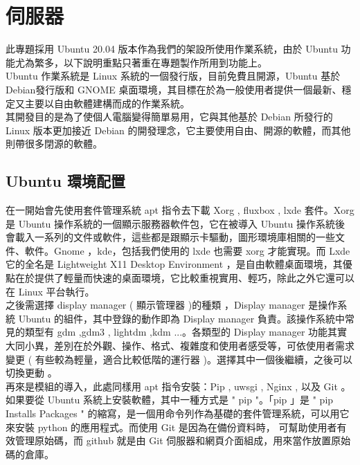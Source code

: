 \documentclass[14pt,a4paper]{report}  %
\begin{document}
\begin{enumerate}

\end{enumerate}

\newpage
\chapter{伺服器}
 此專題採用 Ubuntu 20.04 版本作為我們的架設所使用作業系統，由於 Ubuntu 功能尤為繁多，以下說明重點只著重在專題製作所用到功能上。\\
 
 Ubuntu 作業系統是 Linux 系統的一個發行版，目前免費且開源，Ubuntu 基於 Debian發行版和 GNOME 桌面環境，其目標在於為一般使用者提供一個最新、穩定又主要以自由軟體建構而成的作業系統。\\
 
 其開發目的是為了使個人電腦變得簡單易用，它與其他基於 Debian 所發行的 Linux 版本更加接近 Debian 的開發理念，它主要使用自由、開源的軟體，而其他則帶很多閉源的軟體。\\
\section{Ubuntu 環境配置}
 在一開始會先使用套件管理系統 apt 指令去下載 Xorg , fluxbox , lxde 套件。Xorg 是 Ubuntu 操作系統的一個顯示服務器軟件包，它在被導入 Ubuntu 操作系統後會載入一系列的文件或軟件，這些都是跟顯示卡驅動，圖形環境庫相關的一些文件、軟件。Gnome ，kde，包括我們使用的 lxde 也需要 xorg 才能實現。而 Lxde 它的全名是 Lightweight X11 Desktop Environment ，是自由軟體桌面環境，其優點在於提供了輕量而快速的桌面環境，它比較重視實用、輕巧，除此之外它還可以在 Linux 平台執行。\\
 
 之後需選擇 display manager ( 顯示管理器 )的種類 ，Display manager 是操作系統 Ubuntu 的組件，其中登錄的動作即為 Display manager 負責。該操作系統中常見的類型有 gdm ,gdm3 , lightdm ,kdm ...。各類型的 Display manager 功能其實大同小異，差別在於外觀、操作、格式、複雜度和使用者感受等，可依使用者需求變更 ( 有些較為輕量，適合比較低階的運行器 )。選擇其中一個後繼續，之後可以切換更動 。\\

 再來是模組的導入，此處同樣用 apt 指令安裝：Pip , uwsgi , Nginx  , 以及 Git 。如果要從 Ubuntu 系統上安裝軟體，其中一種方式是 " pip "。「pip 」是 " pip Installs Packages " 的縮寫，是一個用命令列作為基礎的套件管理系統，可以用它來安裝 python 的應用程式。而使用 Git 是因為在備份資料時， 可幫助使用者有效管理原始碼，而 github 就是由 Git 伺服器和網頁介面組成，用來當作放置原始碼的倉庫。\\
 
\end{document}

